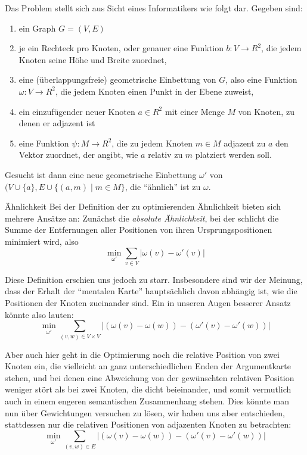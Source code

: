 Das Problem stellt sich aus Sicht eines Informatikers wie folgt dar. Gegeben sind:

\begin{enumerate}
  \item ein Graph $G = (V, E)$
  \item je ein Rechteck pro Knoten, oder genauer eine Funktion $b: V \rightarrow R^2$, die jedem Knoten seine Höhe und Breite zuordnet,
  \item eine (überlappungsfreie) geometrische Einbettung von $G$, also eine Funktion $\omega: V \rightarrow R^2$, die jedem Knoten einen Punkt in der Ebene zuweist,
  \item ein einzufügender neuer Knoten $a \in R^2$ mit einer Menge $M$ von Knoten, zu denen er adjazent ist
  \item eine Funktion $\psi: M \rightarrow R^2$, die zu jedem Knoten $m \in M$ adjazent zu $a$ den Vektor zuordnet, der angibt, wie $a$ relativ zu $m$ platziert werden soll.
\end{enumerate}

Gesucht ist dann eine neue geometrische Einbettung $\omega'$ von $(V \cup \{a\}, E \cup \{(a,m) \mid m \in M\}$, die "`ähnlich"' ist zu $\omega$.

\begin{paragraph}{Ähnlichkeit}
  Bei der Definition der zu optimierenden Ähnlichkeit bieten sich mehrere Ansätze an: Zunächst die \textit{absolute Ähnlichkeit}, bei der schlicht die Summe der Entfernungen aller Positionen von ihren Ursprungspositionen minimiert wird, also
  \begin{equation}
    \min_{\omega'} \sum \limits_{v \in V} {|\omega(v) - \omega'(v)|}
  \end{equation}

  Diese Definition erschien uns jedoch zu starr. Insbesondere sind wir der Meinung, dass der Erhalt der "`mentalen Karte"' hauptsächlich davon abhängig ist, wie die Positionen der Knoten zueinander sind. Ein in unseren Augen besserer Ansatz könnte also lauten:
  \begin{equation}
    \min_{\omega'} \sum \limits_{(v,w) \in V \times V} {|(\omega(v) - \omega(w)) - (\omega'(v) - \omega'(w))|}
  \end{equation}

  Aber auch hier geht in die Optimierung noch die relative Position von zwei Knoten ein, die vielleicht an ganz unterschiedlichen Enden der Argumentkarte stehen, und bei denen eine Abweichung von der gewünschten relativen Position weniger stört als bei zwei Knoten, die dicht beieinander, und somit vermutlich auch in einem engeren semantischen Zusammenhang stehen. Dies könnte man nun über Gewichtungen versuchen zu lösen, wir haben uns aber entschieden, stattdessen nur die relativen Positionen von adjazenten Knoten zu betrachten:
  \begin{equation}
    \label{eqn:opt:basic}
    \min_{\omega'} \sum \limits_{(v,w) \in E} {|(\omega(v) - \omega(w)) - (\omega'(v) - \omega'(w))|}
  \end{equation}
\end{paragraph}

